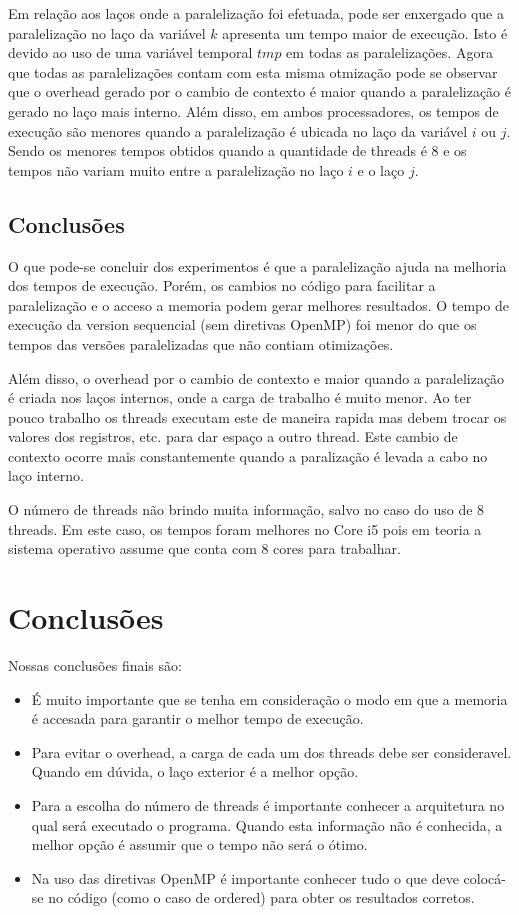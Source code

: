 \documentclass[a4paper,12pt,fleqn]{article}
\begin{document}
Em relação aos laços onde a paralelização foi efetuada, pode ser enxergado que a paralelização no laço da variável $k$ apresenta um tempo maior de execução. Isto é devido ao uso de uma variável temporal $tmp$ em todas as paralelizações. Agora que todas as paralelizações contam com esta misma otmização pode se observar que o overhead gerado por o cambio de contexto é maior quando a paralelização é gerado no laço mais interno. Além disso, em ambos processadores, os tempos de execução são menores quando a paralelização é ubicada no laço da variável $i$ ou $j$. Sendo os menores tempos obtidos quando a quantidade de threads é 8 e os tempos não variam muito entre a paralelização no laço $i$ e o laço $j$. 

\subsection{Conclusões} 

O que pode-se concluir dos experimentos é que a paralelização ajuda na melhoria dos tempos de execução. Porém, os cambios no código para facilitar a paralelização e o acceso a memoria podem gerar melhores resultados. O tempo de execução da version sequencial (sem diretivas OpenMP) foi menor do que os tempos das versões paralelizadas que não contiam otimizações. 

Além disso, o overhead por o cambio de contexto e maior quando a paralelização é criada nos laços internos, onde a carga de trabalho é muito menor. Ao ter pouco trabalho os threads executam este de maneira rapida mas debem trocar os valores dos registros, etc. para dar espaço a outro thread. Este cambio de contexto ocorre mais constantemente quando a paralização é levada a cabo no laço interno. 

O número de threads não brindo muita informação, salvo no caso do uso de 8 threads. Em este caso, os tempos foram melhores no Core i5 pois em teoria a sistema operativo assume que conta com 8 cores para trabalhar. 

\clearpage 

\section{Conclusões} 
Nossas conclusões finais são:
\begin{itemize}
    \item É muito importante que se tenha em consideração o modo em que a memoria é accesada para garantir o melhor tempo de execução.
    \item Para evitar o overhead, a carga de cada um dos threads debe ser consideravel. Quando em dúvida, o laço exterior é a melhor opção. 
    \item Para a escolha do número de threads é importante conhecer a arquitetura no qual será executado o programa. Quando esta informação não é conhecida, a melhor opção é assumir que o tempo não será o ótimo.
    \item Na uso das diretivas OpenMP é importante conhecer tudo o que deve colocá-se no código (como o caso de ordered) para obter os resultados corretos.
\end{itemize}
 
\end{document}
